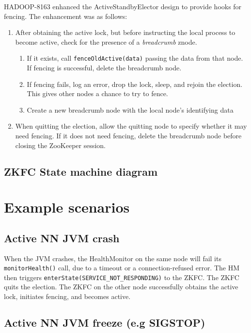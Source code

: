 \documentclass{article}
\begin{document}
HADOOP-8163 enhanced the ActiveStandbyElector design to provide hooks for fencing. The enhancement was as follows:
\begin{enumerate}
\item After obtaining the active lock, but before instructing the local process to become active, check for the presence of a {\em breadcrumb} znode.
  \begin{enumerate}
  \item If it exists, call {\tt fenceOldActive(data)} passing the data from that node. If fencing is successful, delete the breadcrumb node.
  \item If fencing fails, log an error, drop the lock, sleep, and rejoin the election. This gives other nodes a chance to try to fence.
  \item Create a new breadcrumb node with the local node's identifying data
  \end{enumerate}
\item When quitting the election, allow the quitting node to specify whether it may need fencing. If it does not need fencing, delete the breadcrumb node before closing the ZooKeeper session.
\end{enumerate}

\subsection{ZKFC State machine diagram}



\section{Example scenarios}

\subsection{Active NN JVM crash}

When the JVM crashes, the HealthMonitor on the same node will fail its {\tt monitorHealth()} call, due to a timeout or a connection-refused error. The HM then triggers {\tt enterState(SERVICE\_NOT\_RESPONDING)} to the ZKFC. The ZKFC quits the election. The ZKFC on the other node successfully obtains the active lock, initiates fencing, and becomes active.

\subsection{Active NN JVM freeze (e.g SIGSTOP)}
\end{document}
